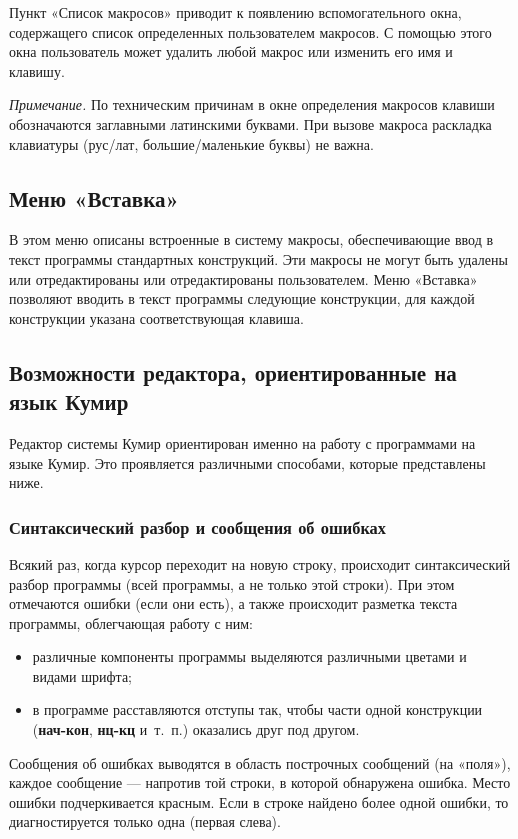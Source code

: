 \documentclass[12pt,a4paper]{article}
\begin{document}
Пункт «Список макросов» приводит к появлению вспомогательного окна, содержащего список определенных пользователем макросов. С помощью этого окна пользователь может удалить любой макрос или изменить его имя и клавишу.

\emph{Примечание.} По техническим причинам в окне определения макросов клавиши обозначаются заглавными латинскими буквами. При вызове макроса раскладка клавиатуры (рус/лат, большие/маленькие буквы) не важна.

\subsection{Меню «Вставка»}

В этом меню описаны встроенные в систему макросы, обеспечивающие ввод в текст программы стандартных конструкций. Эти макросы не могут быть удалены или отредактированы или отредактированы пользователем. Меню «Вставка» позволяют вводить в текст программы следующие конструкции, для каждой конструкции указана соответствующая клавиша.

\subsection{Возможности редактора, ориентированные на язык Кумир}

Редактор системы Кумир ориентирован именно на работу с программами на языке Кумир. Это проявляется различными способами, которые представлены ниже.
	
\subsubsection{Синтаксический разбор и сообщения об ошибках}

Всякий раз, когда курсор переходит на новую строку, происходит синтаксический разбор программы (всей программы, а не только этой строки). При этом отмечаются ошибки (если они есть), а также происходит разметка текста программы, облегчающая работу с ним:
\begin{itemize}
\item различные компоненты программы выделяются различными цветами и видами шрифта;
\item в программе расставляются отступы так, чтобы части одной конструкции (\textbf{\textsf{нач-кон}}, \textbf{\textsf{нц-кц}} и~т.~п.) оказались друг под другом.
\end{itemize}
	
Сообщения об ошибках выводятся в область построчных сообщений (на «поля»), каждое сообщение --- напротив той строки, в которой обнаружена ошибка. Место ошибки подчеркивается красным. Если в строке найдено более одной ошибки, то диагностируется только одна (первая слева).
\end{document}
